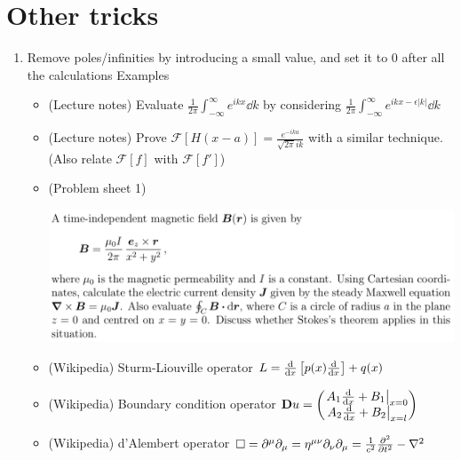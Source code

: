 \documentclass{article}
\theoremstyle{remark}
\theoremstyle{remark}
\begin{document}
    \section*{Other tricks}
    \begin{enumerate}
        \item Remove poles/infinities by introducing a small value, and set it to 0 after all the calculations
        Examples\begin{itemize}
            \item (Lecture notes) Evaluate $\frac{1}{2\pi}\int_{-\infty}^{\infty} e^{ikx} \dd k$ by considering $\frac{1}{2\pi}\int_{-\infty}^{\infty} e^{ikx-\epsilon|k|} \dd k$
            \item (Lecture notes) Prove $\mathcal{F}[H(x-a)]=\frac{e^{-ika}}{\sqrt{2\pi}ik}$ with a similar technique. (Also relate $\mathcal{F}[f]$ with $\mathcal{F}[f']$)
            \item (Problem sheet 1)
            
            \includegraphics*[width=0.8\linewidth]{Mawell_Ampere_Stokes.png}
            \item (Wikipedia) Sturm-Liouville operator $L=\dv{x}\left[p(x)\dv{x}\right]+q(x)$
            \item (Wikipedia) Boundary condition operator $\vb{D}u=\begin{pmatrix}
                \eval{A_1\dv{x}+B_1}_{x=0}\\
                \eval{A_2\dv{x}+B_2}_{x=l}
            \end{pmatrix}$
            \item (Wikipedia) d'Alembert operator $\Box = \partial^\mu\partial_\mu=\eta^{\mu\nu}\partial_\nu\partial_\mu = \frac{1}{c^2}\pdv[2]{t}-\laplacian$
        \end{itemize}
    \end{enumerate}
\end{document}
